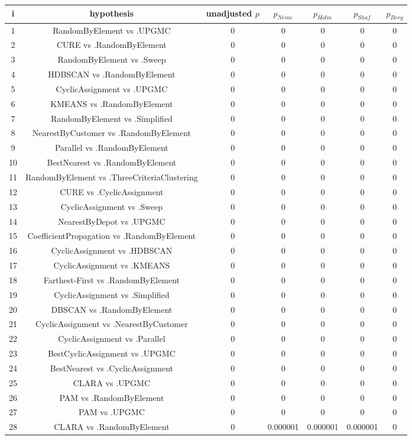 \documentclass[a4paper,10pt]{article}
\begin{document}
\begin{landscape}
\begin{table}[!htp]
\centering\scriptsize
\begin{tabular}{ccccccc}
i&hypothesis&unadjusted $p$&$p_{Neme}$&$p_{Holm}$&$p_{Shaf}$&$p_{Berg}$\\
\hline1&RandomByElement vs .UPGMC&0&0&0&0&0\\
2&CURE vs .RandomByElement&0&0&0&0&0\\
3&RandomByElement vs .Sweep&0&0&0&0&0\\
4&HDBSCAN vs .RandomByElement&0&0&0&0&0\\
5&CyclicAssignment vs .UPGMC&0&0&0&0&0\\
6&KMEANS vs .RandomByElement&0&0&0&0&0\\
7&RandomByElement vs .Simplified&0&0&0&0&0\\
8&NearestByCustomer vs .RandomByElement&0&0&0&0&0\\
9&Parallel vs .RandomByElement&0&0&0&0&0\\
10&BestNearest vs .RandomByElement&0&0&0&0&0\\
11&RandomByElement vs .ThreeCriteriaClustering&0&0&0&0&0\\
12&CURE vs .CyclicAssignment&0&0&0&0&0\\
13&CyclicAssignment vs .Sweep&0&0&0&0&0\\
14&NearestByDepot vs .UPGMC&0&0&0&0&0\\
15&CoefficientPropagation vs .RandomByElement&0&0&0&0&0\\
16&CyclicAssignment vs .HDBSCAN&0&0&0&0&0\\
17&CyclicAssignment vs .KMEANS&0&0&0&0&0\\
18&Farthest-First vs .RandomByElement&0&0&0&0&0\\
19&CyclicAssignment vs .Simplified&0&0&0&0&0\\
20&DBSCAN vs .RandomByElement&0&0&0&0&0\\
21&CyclicAssignment vs .NearestByCustomer&0&0&0&0&0\\
22&CyclicAssignment vs .Parallel&0&0&0&0&0\\
23&BestCyclicAssignment vs .UPGMC&0&0&0&0&0\\
24&BestNearest vs .CyclicAssignment&0&0&0&0&0\\
25&CLARA vs .UPGMC&0&0&0&0&0\\
26&PAM vs .RandomByElement&0&0&0&0&0\\
27&PAM vs .UPGMC&0&0&0&0&0\\
28&CLARA vs .RandomByElement&0&0.000001&0.000001&0.000001&0\\

\end{tabular}
\end{table}
\end{landscape}
\end{document}
